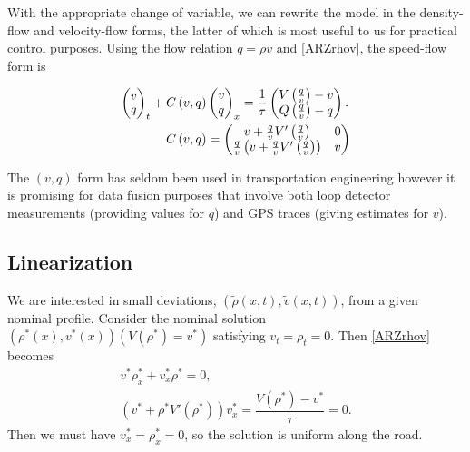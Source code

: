 \documentclass[a4paper, 10pt, conference]{ieeeconf}      %
\begin{document}
With the appropriate change of variable, we can rewrite the model in the density-flow and velocity-flow forms, the latter of which is most useful to us for practical control purposes. Using the flow relation $q = \rho v$ and \eqref{ARZrhov}, the speed-flow form is

{\footnotesize
\begin{subequations}
\begin{align}
\footnotesize
\begin{pmatrix}
	v \\ 
	q
\end{pmatrix}_t
+ C\left(v, q\right)&
\begin{pmatrix}
	v \\ 
	q
\end{pmatrix}_x 
=
\dfrac{1}{\tau}
\begin{pmatrix}
	V\left( \frac{q}{v}\right) - v \\
	Q\left( \frac{q}{v}\right) - q
\end{pmatrix}. \label{ARZvq} \\
C\left(v, q \right)
&=
\begin{pmatrix}
	v + \frac{q}{v} V'\left( \frac{q}{v} \right) & 0 \\
	\frac{q}{v} \left( v + \frac{q}{v} V'\left( \frac{q}{v} \right) \right) & v
\end{pmatrix}
\end{align}
\end{subequations}
}

The $\left(v, q \right)$ form has seldom been used in transportation engineering however it is promising for data fusion purposes that involve both loop detector measurements (providing values for $q$) and GPS traces (giving estimates for $v$).


\subsection{Linearization}
We are interested in small deviations, {\footnotesize$(\tilde{\rho}(x,t), \tilde{v}(x,t))$}, from a given nominal profile. Consider the nominal solution {\footnotesize$(\rho^*(x),v^*(x))(V(\rho^*) = v^*)$} satisfying {\footnotesize$v_t = \rho_t = 0$}. Then \eqref{ARZrhov} becomes
{\footnotesize
\begin{align}
v^* \rho^*_x + v^*_x\rho^* = 0, \\
( v^* + \rho^* V'( \rho^*) )v^*_x = \dfrac{V(\rho^*) - v^*}{\tau} = 0.
\end{align}
}
Then we must have {\footnotesize$v^*_x=\rho^*_x=0$}, so the solution is uniform along the road. 
\end{document}
